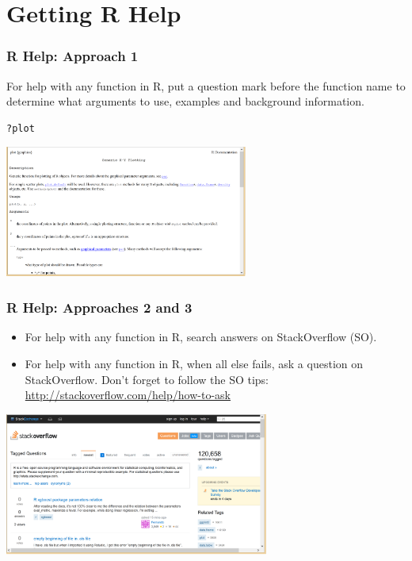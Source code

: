 \section[Help]{Getting R Help}

\begin{frame}[fragile]
\frametitle{R Help: Approach 1}

\vspace{-5pt}
For help with any function in R, put a question mark before the function name to determine what arguments to use, examples and background information.

  \begin{lstlisting}
?plot
  \end{lstlisting}

  \begin{center}
    \includegraphics[width=0.6\textwidth]{images/Rhelp}
  \end{center}

\end{frame}

\begin{frame}[fragile]
\frametitle{R Help: Approaches 2 and 3}

\vspace{-5pt}
  \begin{itemize}
    \item For help with any function in R, search answers on StackOverflow (SO).
    \item For help with any function in R, when all else fails, ask a question on StackOverflow.  Don't forget to follow the SO tips: \url{http://stackoverflow.com/help/how-to-ask}
  \end{itemize}

  \begin{center}
  \includegraphics[width=0.65\textwidth]{images/SO}
  \end{center}

\end{frame}



